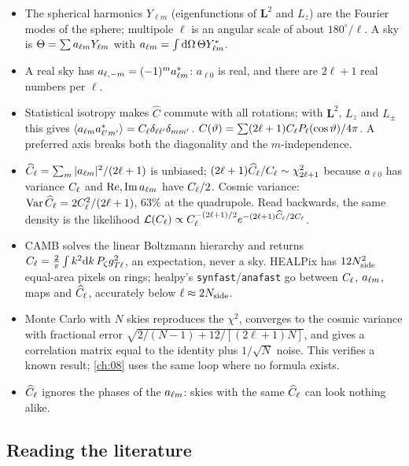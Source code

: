 \begin{recap}
\begin{itemize}[itemsep=1pt,leftmargin=1.2em]
  \item The spherical harmonics $Y_{\ell m}$ (eigenfunctions of $\bm L^2$ and $L_z$) are the
        Fourier modes of the sphere; multipole $\ell$ is an angular scale of about $180^\circ/\ell$.
        A sky is $\Theta=\sum a_{\ell m} Y_{\ell m}$ with $a_{\ell m}=\int\mathrm{d}\Omega\,\Theta Y^*_{\ell m}$.
  \item A real sky has $a_{\ell,-m}=(-1)^ma_{\ell m}^*$: $a_{\ell0}$ is real, and there are $2\ell+1$
        real numbers per $\ell$.
  \item Statistical isotropy makes $\hat C$ commute with all rotations; with $\bm L^2$, $L_z$ and
        $L_\pm$ this gives $\langle a_{\ell m} a^*_{\ell'm'}\rangle=C_\ell\delta_{\ell\ell'}\delta_{mm'}$.
        $C(\vartheta)=\sum(2\ell+1)C_\ell P_\ell(\cos\vartheta)/4\pi$. A preferred axis breaks
        both the diagonality and the $m$-independence.
  \item $\widehat{C}_\ell=\sum_m|a_{\ell m}|^2/(2\ell+1)$ is unbiased; $(2\ell+1)\widehat{C}_\ell/C_\ell\sim\chi^2_{2\ell+1}$
        because $a_{\ell0}$ has variance $C_\ell$ and $\mathrm{Re},\mathrm{Im}\,a_{\ell m}$ have
        $C_\ell/2$. Cosmic variance: $\operatorname{Var}\widehat{C}_\ell=2C_\ell^2/(2\ell+1)$, $63\%$ at the quadrupole.
        Read backwards, the same density is the likelihood
        $\mathcal{L}(C_\ell)\propto C_\ell^{-(2\ell+1)/2}e^{-(2\ell+1)\widehat{C}_\ell/2C_\ell}$.
  \item CAMB solves the linear Boltzmann hierarchy and returns $C_\ell=\frac2\pi\int k^2\mathrm{d} k\,
        P_\zeta g_{T\ell}^2$, an expectation, never a sky. HEALPix has $12N_{\rm side}^2$ equal-area
        pixels on rings; healpy's \texttt{synfast}/\texttt{anafast} go between $C_\ell$, $a_{\ell m}$,
        maps and $\widehat{C}_\ell$, accurately below $\ell\approx2N_{\rm side}$.
  \item Monte Carlo with $N$ skies reproduces the $\chi^2$, converges to the cosmic variance with
        fractional error $\sqrt{2/(N-1)+12/[(2\ell+1)N]}$, and gives a correlation matrix equal to
        the identity plus $1/\sqrt N$ noise. This verifies a known result; \cref{ch:08} uses the same
        loop where no formula exists.
  \item $\widehat{C}_\ell$ ignores the phases of the $a_{\ell m}$: skies with the same $\widehat{C}_\ell$ can look nothing
        alike.
\end{itemize}
\end{recap}

\subsection*{Reading the literature}
\label{7b:sec:reading-list}

